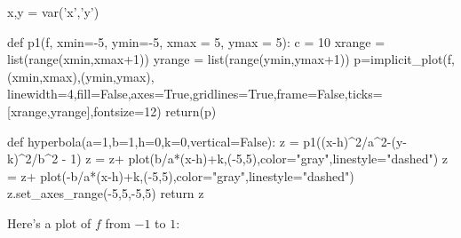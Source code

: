 \documentclass{article}
\begin{document}
\setlength{\indent}{0}

\begin{sagesilent}
	x,y = var('x','y')

	def p1(f, xmin=-5, ymin=-5, xmax = 5, ymax = 5):
		  c = 10
		  xrange = list(range(xmin,xmax+1))
		  yrange = list(range(ymin,ymax+1))
		  p=implicit_plot(f,(xmin,xmax),(ymin,ymax),
			linewidth=4,fill=False,axes=True,gridlines=True,frame=False,ticks=[xrange,yrange],fontsize=12)
		  return(p)

	def hyperbola(a=1,b=1,h=0,k=0,vertical=False):
		  z = p1((x-h)^2/a^2-(y-k)^2/b^2 - 1)
		  z = z+ plot(b/a*(x-h)+k,(-5,5),color="gray",linestyle="dashed")
		  z = z+ plot(-b/a*(x-h)+k,(-5,5),color="gray",linestyle="dashed")
		  z.set_axes_range(-5,5,-5,5)
		  return z
\end{sagesilent}



Here's a plot of $f$ from $-1$ to $1$:

\end{document}
